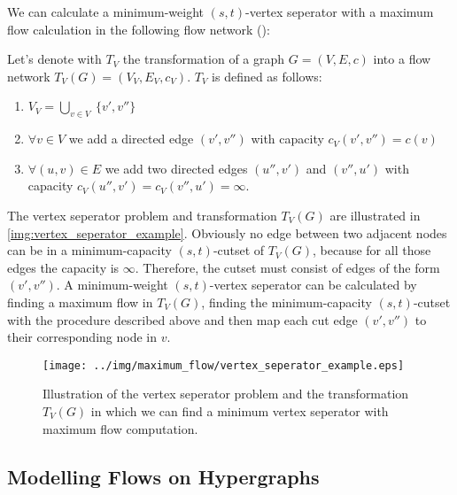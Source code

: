 We can calculate a minimum-weight $(s,t)$-vertex seperator with a maximum flow
calculation in the following flow network ():

\begin{definition}
\label{def:vertex_seperator_transformation}
Let's denote with $T_V$ the transformation of a graph $G = (V,E,c)$ into 
a flow network $T_V(G) = (V_V, E_V, c_V)$. $T_V$ is defined as follows:
\begin{enumerate}
\item $V_V = \bigcup\limits_{v \in V}\ \{v', v''\}$
\item $\forall v \in V$ we add a directed edge $(v',v'')$
      with capacity $c_V(v',v'') = c(v)$
\item $\forall (u,v) \in E$ we add two directed edges $(u'', v')$ and 
      $(v'', u')$ with capacity $c_V(u'', v') = c_V(v'', u') = \infty$.
\end{enumerate} 
\end{definition}

The vertex seperator problem and transformation $T_V(G)$ are illustrated in \autoref{img:vertex_seperator_example}.
Obviously no edge between two adjacent nodes can be in a minimum-capacity $(s,t)$-cutset of $T_V(G)$,
because for all those edges the capacity is $\infty$. Therefore, the cutset must consist
of edges of the form $(v',v'')$. A minimum-weight $(s,t)$-vertex seperator can be calculated by
finding a maximum flow in $T_V(G)$, finding the minimum-capacity $(s,t)$-cutset with the procedure
described above and then map each cut edge $(v',v'')$ to their corresponding node in $v$.


\begin{figure}
\centering
\texttt{[image: ../img/maximum\_flow/vertex\_seperator\_example.eps]}
\caption{ Illustration of the vertex seperator problem and the transformation $T_V(G)$ in which
          we can find a minimum vertex seperator with maximum flow computation. }
\label{img:vertex_seperator_example}
\end{figure}


\subsection{Modelling Flows on Hypergraphs}
\label{sec:related_model_flow}

